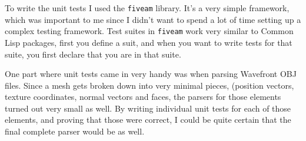 

To write the unit tests I used the \texttt{fiveam} library.
It's a very simple framework,
which was important to me since I didn't want to spend a lot of time setting up a complex testing framework.
Test suites in \texttt{fiveam} work very similar to Common Lisp packages,
first you define a suit,
and when you want to write tests for that suite,
you first declare that you are in that suite\cite{fiveam}.

One part where unit tests came in very handy was when parsing Wavefront OBJ files.
Since a mesh gets broken down into very minimal pieces,
(position vectors, texture coordinates, normal vectors and faces,
the parsers for those elements turned out very small as well.
By writing individual unit tests for each of those elements,
and proving that those were correct,
I could be quite certain that the final complete parser would be as well.
